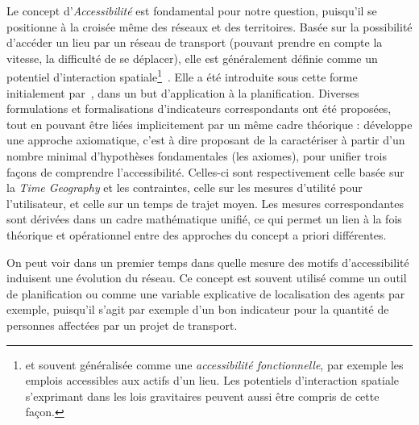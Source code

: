 {Le concept d'\emph{Accessibilité} est fondamental pour notre question, puisqu'il se positionne à la croisée même des réseaux et des territoires. Basée sur la possibilité d'accéder un lieu par un réseau de transport (pouvant prendre en compte la vitesse, la difficulté de se déplacer), elle est généralement définie comme un potentiel d'interaction spatiale\footnote{et souvent généralisée comme une \emph{accessibilité fonctionnelle}, par exemple les emplois accessibles aux actifs d'un lieu. Les potentiels d'interaction spatiale s'exprimant dans les lois gravitaires peuvent aussi être compris de cette façon.}~\cite{bavoux2005geographie}. Elle a été introduite sous cette forme initialement par~\cite{hansen1959accessibility}, dans un but d'application à la planification. Diverses formulations et formalisations d'indicateurs correspondants ont été proposées, tout en pouvant être liées implicitement par un même cadre théorique : \cite{miller1999measuring} développe une approche axiomatique, c'est à dire proposant de la caractériser à partir d'un nombre minimal d'hypothèses fondamentales (les axiomes), pour unifier trois façons de comprendre l'accessibilité. Celles-ci sont respectivement celle basée sur la \emph{Time Geography} et les contraintes, celle sur les mesures d'utilité pour l'utilisateur, et celle sur un temps de trajet moyen. Les mesures correspondantes sont dérivées dans un cadre mathématique unifié, ce qui permet un lien à la fois théorique et opérationnel entre des approches du concept a priori différentes.
}


\bpar{}
{
On peut voir dans un premier temps dans quelle mesure des motifs d'accessibilité induisent une évolution du réseau. Ce concept est souvent utilisé comme un outil de planification ou comme une variable explicative de localisation des agents par exemple, puisqu'il s'agit par exemple d'un bon indicateur pour la quantité de personnes affectées par un projet de transport.}


